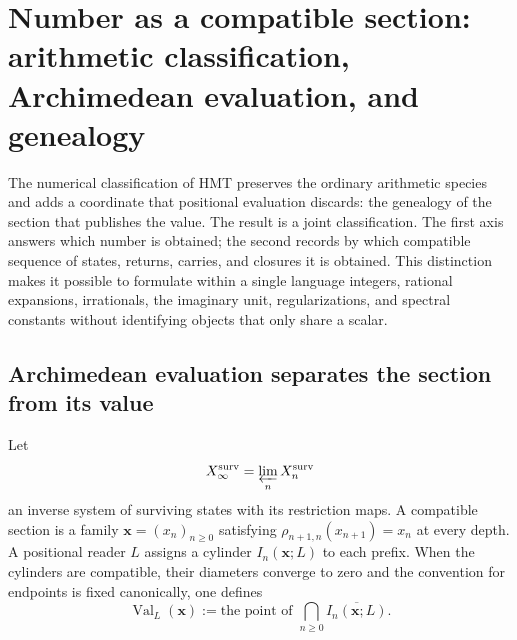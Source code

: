 \label{chap:p3-83-44-clasificacion_numero}









\section[Number as a compatible section]{Number as a compatible
section: arithmetic classification, Archimedean evaluation, and
genealogy}
\label{p3-83-c44-s1:sec:ontologia-numeros-rev11}

The numerical classification of HMT preserves the ordinary arithmetic species and adds a coordinate that positional evaluation discards: the genealogy of the section that publishes the value. The result is a joint classification. The first axis answers which number is obtained; the second records by which compatible sequence of states, returns, carries, and closures it is obtained. This distinction makes it possible to formulate within a single language integers, rational expansions, irrationals, the imaginary unit, regularizations, and spectral constants without identifying objects that only share a scalar.

\subsection{Archimedean evaluation separates the section from its value}

Let
\[
 X_{\infty}^{\rm surv}
 =\varprojlim_n X_n^{\rm surv}
\]
an inverse system of surviving states with its
restriction maps. A compatible section is a family
\(\boldsymbol x=(x_n)_{n\geq0}\) satisfying
\(\rho_{n+1,n}(x_{n+1})=x_n\) at every depth. A positional reader
\(L\) assigns a cylinder \(I_n(\boldsymbol x;L)\) to each prefix. When the
cylinders are compatible, their diameters converge to zero and the
convention for endpoints is fixed canonically, one defines
\begin{equation}
 \operatorname{Val}_{L}(\boldsymbol x)
 :=\text{the point of }
 \bigcap_{n\geq0}\overline{I_n(\boldsymbol x;L)}.
 \label{p3-83-c44-s1:eq:valor-lector-seccion-rev11}
\end{equation}

